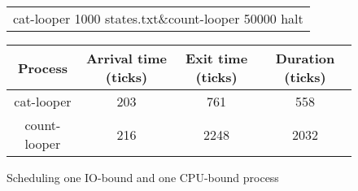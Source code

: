 \documentclass{article}
\newcommand{\command}[1]{{\sffamily#1}}
\begin{document}
\begin{figure}
\centering

\begin{tabular}{l}
\command{cat-looper 1000 states.txt\&count-looper 50000}
\command{halt}
\end{tabular}



\vspace{1em}

\begin{tabular}{cccc}\toprule
Process & Arrival time (ticks) & Exit time (ticks) & Duration (ticks)\\\hline
\command{cat-looper} & \num{203} & \num{761} & \num{558} \\\bottomrule
\command{count-looper} & \num{216} & \num{2248} & \num{2032} \\\bottomrule
\end{tabular}
\caption{Scheduling one IO-bound and one CPU-bound process}
\label{fig:oneEach}
\end{figure}
\end{document}
